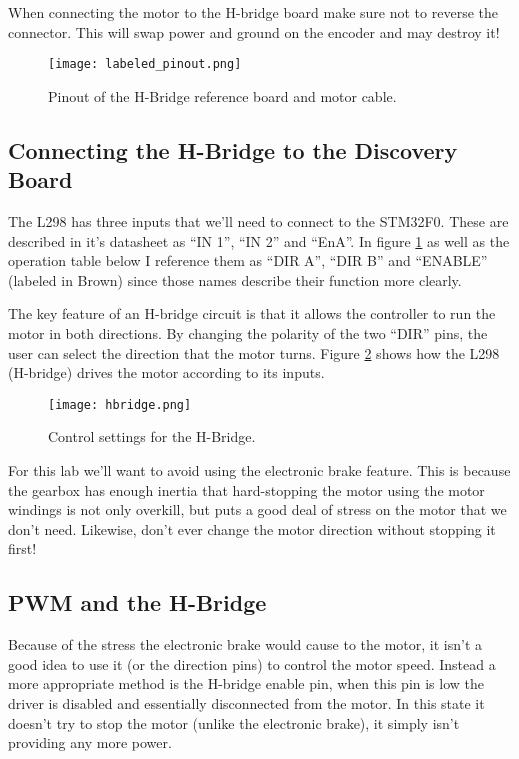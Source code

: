 \documentclass[openany,11pt,fleqn]{book} %
\begin{document}
\begin{warning}
    When connecting the motor to the H-bridge board make sure not to reverse the connector. This will swap power and ground on the encoder and may destroy it!
\end{warning}

\begin{figure}[t]
    \begin{center}
        \hspace*{-3.4cm}
        \texttt{[image: labeled\_pinout.png]}
        \caption{Pinout of the H-Bridge reference board and motor cable.}
        \label{labeled_pinout}
    \end{center}
\end{figure}


\subsection{Connecting the H-Bridge to the Discovery Board}
The L298 has three inputs that we'll need to connect to the STM32F0. These are described in it's datasheet as ``IN 1'', ``IN 2'' and ``EnA''. In figure \ref{labeled_pinout}  as well as the operation table below I reference them as ``DIR A'', ``DIR B'' and ``ENABLE'' (labeled in Brown) since those names describe their function more clearly.

The key feature of an H-bridge circuit is that it allows the controller to run the motor in both directions. By changing the polarity of the two ``DIR'' pins, the user can select the direction that the motor turns. Figure \ref{hbridge} shows how the L298 (H-bridge) drives the motor according to its inputs.

\begin{figure}[b]
    \centering\texttt{[image: hbridge.png]}
    \caption{Control settings for the H-Bridge.}
    \label{hbridge}
\end{figure}

For this lab we'll want to avoid using the electronic brake feature. This is because the gearbox has enough inertia that hard-stopping the motor using the motor windings is not only overkill, but puts a good deal of stress on the motor that we don't need. Likewise, don't ever change the motor direction without stopping it first! 

\subsection{PWM and the H-Bridge}
Because of the stress the electronic brake would cause to the motor, it isn't a good idea to use it (or the direction pins) to control the motor speed. Instead a more appropriate method is the H-bridge enable pin, when this pin is low the driver is disabled and essentially disconnected from the motor. In this state it doesn't try to stop the motor (unlike the electronic brake), it simply isn't providing any more power.
\end{document}
